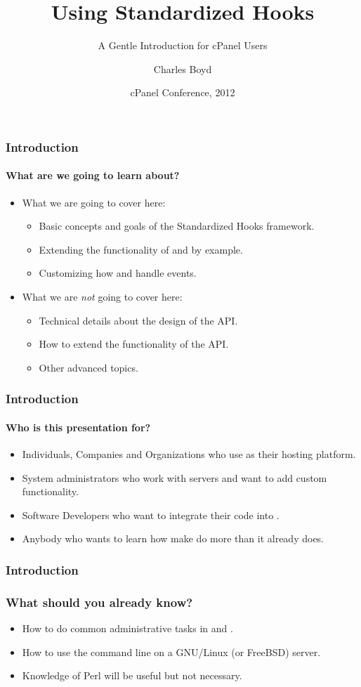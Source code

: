 \documentclass{beamer}
\title{Using Standardized Hooks}
\subtitle{A Gentle Introduction for cPanel Users}
\author{Charles Boyd}
\institute{cPanel, Inc.}
\date{cPanel Conference, 2012}
\begin{document}
\frame{\titlepage}

\begin{frame}
  \frametitle{Introduction}
  \framesubtitle{What are we going to learn about?}
  \begin{itemize}
  \item What we are going to cover here:
    \begin{itemize}
    \item Basic concepts and goals of the Standardized Hooks framework.
    \item Extending the functionality of \WHM and \cPanel by example.
    \item Customizing how \WHM and \cPanel handle events.
    \end{itemize}
  \item What we are {\em not} going to cover here:
    \begin{itemize}
    \item Technical details about the design of the \cPanel API.
    \item How to extend the functionality of the \cPanel API.
    \item Other advanced topics.
    \end{itemize}
  \end{itemize}
\end{frame}

\begin{frame}
  \frametitle{Introduction}
  \framesubtitle{Who is this presentation for?}
  \begin{itemize}
  \item Individuals, Companies and Organizations who use \cPanel as their hosting platform.
  \item System administrators who work with \cPanel servers and want to add custom functionality.
  \item Software Developers who want to integrate their code into \cPanel.
  \item Anybody who wants to learn how make \cPanel do more than it already does.
  \end{itemize}
\end{frame}

\begin{frame}
  \frametitle{Introduction}
  \frametitle{What should you already know?}
  \begin{itemize}
  \item How to do common administrative tasks in \WHM and \cPanel.
  \item How to use the command line on a GNU/Linux (or FreeBSD) server.
  \item Knowledge of Perl will be useful but not necessary.
  \end{itemize}
\end{frame}
\end{document}
